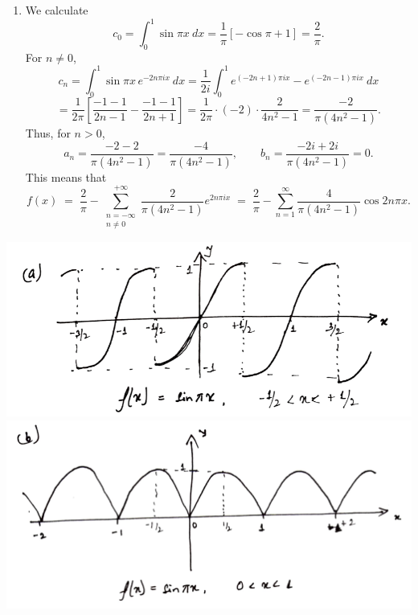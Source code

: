 \documentclass[10pt]{article}
\begin{document}
\begin{enumerate}
                \item We calculate 
                \[
                        c_0 = \int_{0}^{1} \sin{\pi x}\:dx = \frac{1}{\pi}\left[-\cos{\pi} + 1\right] = \frac{2}{\pi}.
                \]
                For $n \neq 0$, 
                \[
                        c_n = \int_{0}^{1} \sin{\pi x}\, e^{-2n\pi i x}\:dx 
                                = \frac{1}{2i} \int_{0}^{1}e^{(-2n + 1)\pi ix} - e^{(-2n - 1)\pi ix}\:dx
                \]
                \[
                        = \frac{1}{2\pi} \left[\frac{-1 - 1}{2n - 1} - \frac{-1 - 1}{2n + 1}\right]
                        = \frac{1}{2\pi} \cdot (-2)\cdot\frac{2}{4n^2 - 1}
                        = \frac{-2}{\pi(4n^2 - 1)}.
                \]
                Thus, for $n > 0$, 
                \[
                        a_n = \frac{-2 - 2}{\pi(4n^2 - 1)} = \frac{-4}{\pi(4n^2 - 1)}, \qquad
                        b_n = \frac{-2i + 2i}{\pi(4n^2 - 1)} = 0.
                \]
                This means that
                \[
                        f(x) \;=\; \frac{2}{\pi} - \sum_{\substack{n = -\infty \\ n \neq 0}}^{+\infty} \frac{2}{\pi(4n^2 - 1)} e^{2n\pi ix} \;=\;
                                \frac{2}{\pi} - \sum_{n = 1}^\infty \frac{4}{\pi(4n^2 - 1)} \cos{2n\pi x}. \tag{$\star$}
                \]
        \end{enumerate}
        \begin{center}
                \includegraphics[scale=0.45]{./6_14a.png}
                \includegraphics[scale=0.4]{./6_14b.png}
        \end{center}
\end{document}
